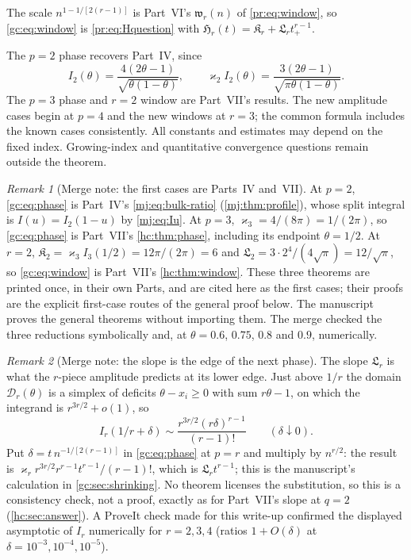 \documentclass[11pt,a4paper]{article}
\theoremstyle{definition}\newaliascnt{definition}{theorem}
\theoremstyle{remark}\newaliascnt{remark}{theorem}
\newtheorem{remark}[remark]{Remark}
\begin{document}
The scale $n^{1-1/[2(r-1)]}$ is Part~VI's $\mathfrak w_r(n)$ of
\eqref{pr:eq:window}, so \eqref{gc:eq:window} is \eqref{pr:eq:Hquestion} with
$\mathfrak H_r(t)=\mathfrak K_r+\mathfrak L_rt_+^{r-1}$.

The $p=2$ phase recovers Part~IV, since
\[
 I_2(\theta)=\frac{4(2\theta-1)}{\sqrt{\theta(1-\theta)}},
 \qquad \varkappa_2I_2(\theta)
       =\frac{3(2\theta-1)}{\sqrt{\pi\theta(1-\theta)}}.
\]
The $p=3$ phase and $r=2$ window are Part~VII's results. The new amplitude
cases begin at $p=4$ and the new windows at $r=3$; the common formula includes
the known cases consistently. All constants and estimates may depend on the
fixed index. Growing-index and quantitative convergence questions remain
outside the theorem.

\begin{remark}[Merge note: the first cases are Parts~IV and~VII]
\label{gc:rem:cases}
At $p=2$, \eqref{gc:eq:phase} is Part~IV's \eqref{mj:eq:bulk-ratio}
(\cref{mj:thm:profile}), whose split integral is $I(u)=I_2(1-u)$ by
\eqref{mj:eq:Iu}. At $p=3$, $\varkappa_3=4/(8\pi)=1/(2\pi)$, so
\eqref{gc:eq:phase} is Part~VII's \cref{hc:thm:phase}, including its endpoint
$\theta=1/2$. At $r=2$, $\mathfrak K_2=\varkappa_3I_3(1/2)=12\pi/(2\pi)=6$ and
$\mathfrak L_2=3\cdot2^4/(4\sqrt\pi)=12/\sqrt\pi$, so \eqref{gc:eq:window} is
Part~VII's \cref{hc:thm:window}. These three theorems are printed once, in
their own Parts, and are cited here as the first cases; their proofs are the
explicit first-case routes of the general proof below. The manuscript proves
the general theorems without importing them. The merge checked the three
reductions symbolically and, at $\theta=0.6$, $0.75$, $0.8$ and $0.9$,
numerically.
\end{remark}

\begin{remark}[Merge note: the slope is the edge of the next phase]
\label{gc:rem:matching}
The slope $\mathfrak L_r$ is what the $r$-piece amplitude predicts at its lower
edge. Just above $1/r$ the domain $\mathcal D_r(\theta)$ is a simplex of
deficits $\theta-x_i\ge0$ with sum $r\theta-1$, on which the integrand is
$r^{3r/2}+o(1)$, so
\[
 I_r(1/r+\delta)\sim\frac{r^{3r/2}(r\delta)^{r-1}}{(r-1)!}\qquad(\delta\downarrow0).
\]
Put $\delta=t\,n^{-1/[2(r-1)]}$ in \eqref{gc:eq:phase} at $p=r$ and
multiply by $n^{r/2}$: the result is
$\varkappa_rr^{3r/2}r^{r-1}t^{r-1}/(r-1)!$, which is $\mathfrak L_rt^{r-1}$; this is the manuscript's calculation in
\cref{gc:sec:shrinking}. No theorem licenses the substitution, so this is a
consistency check, not a proof, exactly as for Part~VII's slope at $q=2$
(\cref{hc:sec:answer}). A ProveIt check made for this write-up confirmed the
displayed asymptotic of $I_r$ numerically for $r=2,3,4$ (ratios
$1+O(\delta)$ at $\delta=10^{-3},10^{-4},10^{-5}$).
\end{remark}
\end{document}
